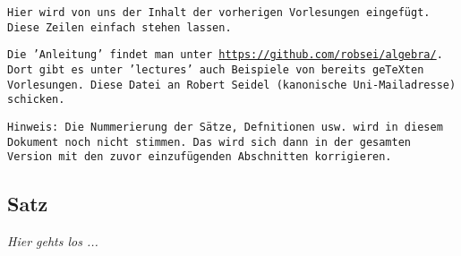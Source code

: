 \documentclass[11pt, a4paper, titlepage, bibliography=totoc]{scrbook}
\begin{document}
\texttt{Hier wird von uns der Inhalt der vorherigen Vorlesungen eingefügt. Diese Zeilen einfach stehen lassen.}

\texttt{Die 'Anleitung' findet man unter \url{https://github.com/robsei/algebra/}. Dort gibt es unter 'lectures' auch Beispiele von bereits geTeXten Vorlesungen. Diese Datei an Robert Seidel (kanonische Uni-Mailadresse) schicken.}

\texttt{Hinweis: Die Nummerierung der Sätze, Defnitionen usw. wird in diesem Dokument noch nicht stimmen. Das wird sich dann in der gesamten Version mit den zuvor einzufügenden Abschnitten korrigieren.}

\subsection{Satz} \textsl{Hier gehts los ...}
\end{document}
